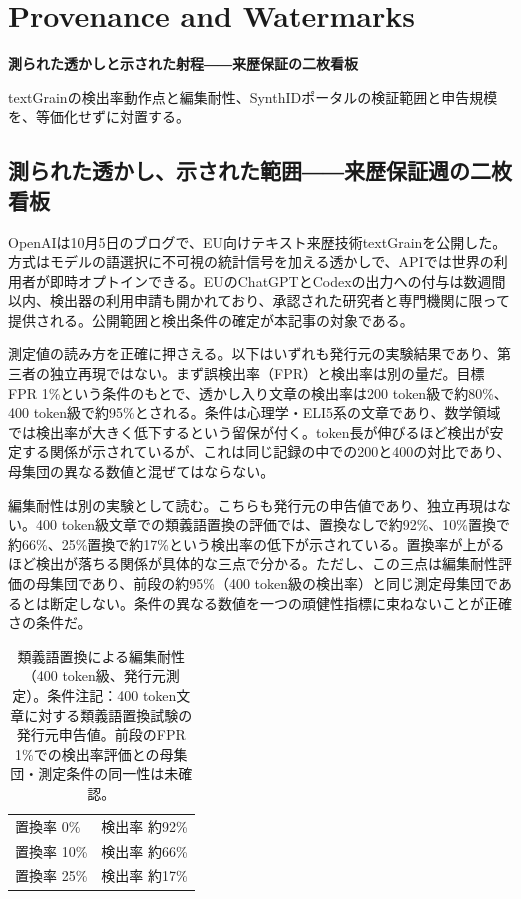 \section{Provenance and Watermarks}
\begin{wideflow}
{\Large\bfseries 測られた透かしと示された射程――来歴保証の二枚看板\par}
\smallskip
{\color{SurveyMuted}textGrainの検出率動作点と編集耐性、SynthIDポータルの検証範囲と申告規模を、等価化せずに対置する。\par}
\end{wideflow}

\subsection*{測られた透かし、示された範囲――来歴保証週の二枚看板}

OpenAIは10月5日のブログで、EU向けテキスト来歴技術textGrainを公開した。方式はモデルの語選択に不可視の統計信号を加える透かしで、APIでは世界の利用者が即時オプトインできる。EUのChatGPTとCodexの出力への付与は数週間以内、検出器の利用申請も開かれており、承認された研究者と専門機関に限って提供される。公開範囲と検出条件の確定が本記事の対象である。\cite{textgrain}

測定値の読み方を正確に押さえる。以下はいずれも発行元の実験結果であり、第三者の独立再現ではない。まず誤検出率（FPR）と検出率は別の量だ。目標FPR 1\%という条件のもとで、透かし入り文章の検出率は200 token級で約80\%、400 token級で約95\%とされる。条件は心理学・ELI5系の文章であり、数学領域では検出率が大きく低下するという留保が付く。token長が伸びるほど検出が安定する関係が示されているが、これは同じ記録の中での200と400の対比であり、母集団の異なる数値と混ぜてはならない。\cite{textgrain}

編集耐性は別の実験として読む。こちらも発行元の申告値であり、独立再現はない。400 token級文章での類義語置換の評価では、置換なしで約92\%、10\%置換で約66\%、25\%置換で約17\%という検出率の低下が示されている。置換率が上がるほど検出が落ちる関係が具体的な三点で分かる。ただし、この三点は編集耐性評価の母集団であり、前段の約95\%（400 token級の検出率）と同じ測定母集団であるとは断定しない。条件の異なる数値を一つの頑健性指標に束ねないことが正確さの条件だ。\cite{textgrain}

\begin{table}[htbp]
\centering\footnotesize
\begin{tabularx}{0.98\linewidth}{@{}lX@{}}
\toprule
置換率 0\% & 検出率 約92\% \\
置換率 10\% & 検出率 約66\% \\
置換率 25\% & 検出率 約17\% \\
\bottomrule
\end{tabularx}
\caption{類義語置換による編集耐性（400 token級、発行元測定）。条件注記：400 token文章に対する類義語置換試験の発行元申告値。前段のFPR 1\%での検出率評価との母集団・測定条件の同一性は未確認。}
\end{table}
\noindent \cite{textgrain}


